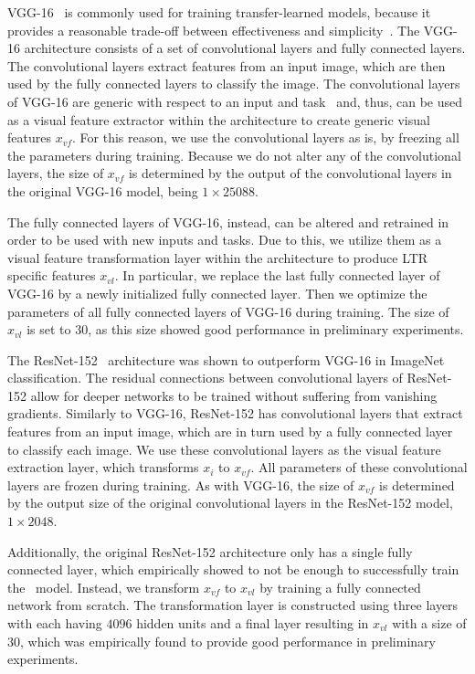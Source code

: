 VGG-16~\cite{simonyan2014very} is commonly used for training transfer-learned models,
because it provides a reasonable trade-off between effectiveness and simplicity~\cite{shan2017two}.
The VGG-16 architecture consists of a set of convolutional layers and fully connected layers. 
The convolutional layers extract features from an input image, which are then used by the fully connected layers to classify the image. 
The convolutional layers of VGG-16 are generic with respect to an input and task~\citep{donahue2014decaf}
and, thus, can be used as a visual feature extractor within the \modelname{} architecture to create generic visual features $x_{vf}$.
For this reason, we use the convolutional layers as is, by freezing all the parameters during training.
Because we do not alter any of the convolutional layers, the size of $x_{vf}$ is determined by the output of the convolutional layers in the original VGG-16 model, being $1\times25088$.

The fully connected layers of VGG-16, instead, can be altered and retrained in order to be used with new inputs and tasks.
Due to this, we utilize them as a visual feature transformation layer within the \modelname{} architecture to produce \ac{LTR} specific features $x_{vl}$.
In particular, we replace the last fully connected layer of VGG-16 by a newly initialized fully connected layer.
Then we optimize the parameters of all fully connected layers of VGG-16 during training.
The size of $x_{vl}$ is set to $30$, as this size showed good performance in preliminary experiments.

The ResNet-152~\cite{he2016deep} architecture was shown to outperform VGG-16 in ImageNet classification.
The residual connections between convolutional layers of ResNet-152 allow for deeper networks to be trained without suffering from vanishing gradients.
Similarly to VGG-16, ResNet-152 has convolutional layers that extract features from an input image, which are in turn used by a fully connected layer to classify each image.
We use these convolutional layers as the visual feature extraction layer, which transforms $x_{i}$ to $x_{vf}$. All parameters of these convolutional layers are frozen during training. As with VGG-16, the size of $x_{vf}$ is determined by the output size of the original convolutional layers in the ResNet-152 model, $1\times2048$.


Additionally, the original ResNet-152 architecture only has a single fully connected layer, which empirically showed to not be enough to successfully train the \modelname~model.
Instead, we transform $x_{vf}$ to $x_{vl}$ by training a fully connected network from scratch.
The transformation layer is constructed using three layers with each having $4096$ hidden units and a final layer resulting in $x_{vl}$ with a size of $30$, which was empirically found to provide good performance in preliminary experiments.


